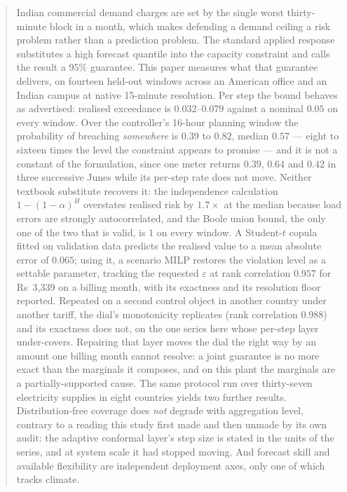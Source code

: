 \documentclass[journal]{IEEEtran}
\newcommand{\rupee}[1]{\textsf{Rs}~#1}
\begin{document}
\begin{abstract}
Indian commercial demand charges are set by the single worst thirty-minute
block in a month, which makes defending a demand ceiling a risk problem rather
than a prediction problem. The standard applied response substitutes a high
forecast quantile into the capacity constraint and calls the result a $95\%$
guarantee. This paper measures what that guarantee delivers, on fourteen
held-out windows across an American office and an Indian campus at native
15-minute resolution. Per step the bound behaves as advertised: realised
exceedance is $0.032$--$0.079$ against a nominal $0.05$ on every window. Over
the controller's 16-hour planning window the probability of breaching
\emph{somewhere} is $0.39$ to $0.82$, median $0.57$ --- eight to sixteen times
the level the constraint appears to promise --- and it is not a constant of the
formulation, since one meter returns $0.39$, $0.64$ and $0.42$ in three
successive Junes while its per-step rate does not move. Neither textbook
substitute recovers it: the independence calculation $1-(1-\alpha)^{H}$
overstates realised risk by $1.7\times$ at the median because load errors are
strongly autocorrelated, and the Boole union bound, the only one of the two
that is valid, is $1$ on every window. A Student-$t$ copula fitted on
validation data predicts the realised value to a mean absolute error of
$0.065$; using it, a scenario MILP restores the violation level as a settable
parameter, tracking the requested $\varepsilon$ at rank correlation $0.957$ for
\rupee{3{,}339} on a billing month, with its exactness and its resolution floor
reported. Repeated on a second control object in another country under another
tariff, the dial's monotonicity replicates (rank correlation $0.988$) and its
exactness does not, on the one series here whose per-step layer under-covers.
Repairing that layer moves the dial the right way by an amount one billing
month cannot resolve: a joint guarantee is no more exact than the marginals it
composes, and on this plant the marginals are a partially-supported cause. The same protocol run over thirty-seven electricity supplies in eight
countries yields two further results. Distribution-free coverage does
\emph{not} degrade with aggregation level, contrary to a reading this study
first made and then unmade by its own audit: the adaptive conformal layer's
step size is stated in the units of the series, and at system scale it had
stopped moving. And forecast skill and available flexibility are independent
deployment axes, only one of which tracks climate.
\end{abstract}
\end{document}
